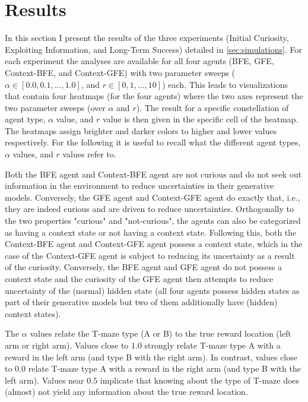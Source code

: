 \chapter{Results}
\label{results}

In this section I present the results of the three experiments (Initial Curiosity, Exploiting Information, and Long-Term Success) detailed in \cref{sec:simulations}. For each experiment the analyses are available for all four agents (BFE, GFE, Context-BFE, and Context-GFE) with two parameter sweeps (\(\alpha \in [0.0, 0.1, \dots, 1.0]\), and \(r \in [0, 1, \dots, 10]\)) each. This leads to visualizations that contain four heatmaps (for the four agents) where the two axes represent the two parameter sweeps (over \(\alpha\) and \(r\)). The result for a specific constellation of agent type, \(\alpha\) value, and \(r\) value is then given in the specific cell of the heatmap. The heatmaps assign brighter and darker colors to higher and lower values respectively. For the following it is useful to recall what the different agent types, \(\alpha\) values, and \(r\) values refer to.

Both the BFE agent and Context-BFE agent are not curious and do not seek out information in the environment to reduce uncertainties in their generative models. Conversely, the GFE agent and Context-GFE agent do exactly that, i.e., they are indeed curious and are driven to reduce uncertainties.
Orthogonally to the two properties "curious" and "not-curious", the agents can also be categorized as having a context state or not having a context state. Following this, both the Context-BFE agent and Context-GFE agent possess a context state, which in the case of the Context-GFE agent is subject to reducing its uncertainty as a result of the curiosity. Conversely, the BFE agent and GFE agent do not possess a context state and the curiosity of the GFE agent then attempts to reduce uncertainty of the (normal) hidden state (all four agents possess hidden states as part of their generative models but two of them additionally have (hidden) context states).

The \(\alpha\) values relate the T-maze type (A or B) to the true reward location (left arm or right arm). Values close to \(1.0\) strongly relate T-maze type A with a reward in the left arm (and type B with the right arm). In contrast, values close to \(0.0\) relate T-maze type A with a reward in the right arm (and type B with the left arm). Values near \(0.5\) implicate that knowing about the type of T-maze does (almost) not yield any information about the true reward location.

